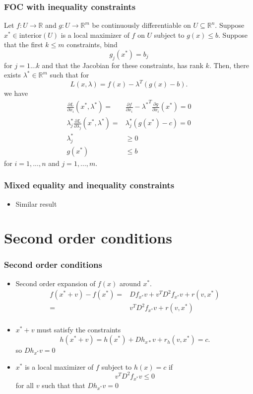 \documentclass[compress]{beamer}
\def\R{\mathbb{R}}
\renewcommand{\to}{{\rightarrow}}
\begin{document}
\begin{frame}[shrink]\frametitle{FOC with inequality constraints}
\begin{theorem} \label{thm:icon}
  Let $f:U \to \R$ and $g: U \to \R^m$ be continuously
  differentiable on $U \subseteq \R^n$. Suppose $x^* \in
  \mathrm{interior}(U)$ is a local maximizer of $f$ on $U$ subject to 
  $g(x) \leq b$. Suppose that the first $k \leq m$ constraints, bind
  \[ g_j(x^*) = b_j \]
  for $j = 1 ... k$ and that the Jacobian for these constraints, 
  has rank $k$. Then, there exists
  $\lambda^* \in \R^m$ such that for
  \[ L(x,\lambda) = f(x) - \lambda^T (g(x) - b). \]
  we have
  \begin{align*}
    \frac{\partial L}{\partial x_i}(x^*,\lambda^*) = & \frac{\partial
      f}{\partial x_i} - {\lambda^*}^T \frac{\partial g}{\partial
      x_i}(x^*) = 0 \\
    \lambda_j^* \frac{\partial L}{\partial \lambda_j}(x^*,\lambda^*) =
    & \lambda_j^* \left(g(x^*) - c \right)= 0 \\
    \lambda_j^* & \geq 0 \\
    g(x^*) & \leq b
  \end{align*}
  for $i = 1, ..., n$ and $j=1,...,m$.
\end{theorem}
\end{frame}

\begin{frame}
  \frametitle{Mixed equality and inequality constraints}
  \begin{itemize}
  \item Similar result
  \end{itemize}
\end{frame}

\section{Second order conditions}

\begin{frame}\frametitle{Second order conditions}
  \begin{itemize}
  \item Second order expansion of $f(x)$ around $x^*$. 
    \begin{align*}
      f(x^*+v) - f(x^*) = & Df_{x^*} v + v^T D^2 f_{x^*}
      v + r(v,x^*) \\
      = & v^T D^2 f_{x^*} v + r(v,x^*) \\
    \end{align*}
  \item $x^* + v$ must satisfy the constraints 
    \[ h(x^* + v) = h(x^*) + Dh_{x*} v + r_h(v,x^*) = c. \]
    so $Dh_{x^*} v = 0$
  \item $x^*$ is a local maximizer of $f$ subject to $h(x) = c$ if
    \[ v^T D^2 f_{x^*} v \leq 0 \] for all $v$ such that that $Dh_{x^*} v
    = 0$
  \end{itemize}
\end{frame}
\end{document}
